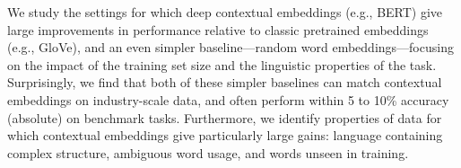 We study the settings for which deep contextual embeddings (e.g., BERT) give large improvements in performance relative to classic pretrained embeddings (e.g., GloVe), and an even simpler baseline---random word embeddings---focusing on the impact of the training set size and the linguistic properties of the task. Surprisingly, we find that both of these simpler baselines can match contextual embeddings on industry-scale data, and often perform within 5 to 10\% accuracy (absolute) on benchmark tasks. Furthermore, we identify properties of data for which contextual embeddings give particularly large gains: language containing complex structure, ambiguous word usage, and words unseen in training.
